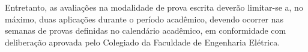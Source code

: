 \documentclass[oneside,a4paper,12pt]{article}
\begin{document}
Entretanto, as avaliações na modalidade de prova escrita deverão limitar-se a, no máximo, duas aplicações durante o período acadêmico, devendo ocorrer nas semanas de provas definidas no calendário acadêmico, em conformidade com deliberação aprovada pelo Colegiado da Faculdade de Engenharia Elétrica.%
%
%
%
\vspace{10pt}
\nocite{*}
\nocite{*}
\end{document}
